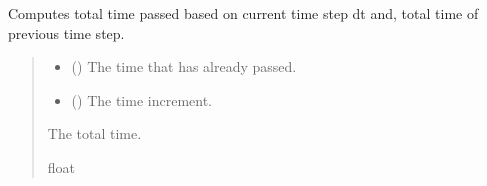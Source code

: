\documentclass[a4paper,11pt,english,openany]{sphinxmanual}
\begin{document}
\begin{fulllineitems}
\label{\detokenize{api/spyice.utils.helpers:spyice.utils.helpers.t_total}}
\pysigstartsignatures
{}
\pysigstopsignatures
\sphinxAtStartPar
Computes total time passed based on current time step dt and, total time of previous time step.
\begin{quote}\begin{description}
\begin{itemize}
\item {} 
\sphinxAtStartPar
{} () \textendash{} The time that has already passed.

\item {} 
\sphinxAtStartPar
{} () \textendash{} The time increment.

\end{itemize}

\sphinxAtStartPar
The total time.

\sphinxAtStartPar
float

\end{description}\end{quote}

\end{fulllineitems}


\sphinxstepscope
{}\label{\detokenize{api/spyice.utils.spyice_exceptions:module-spyice.utils.spyice_exceptions}}
\end{document}
